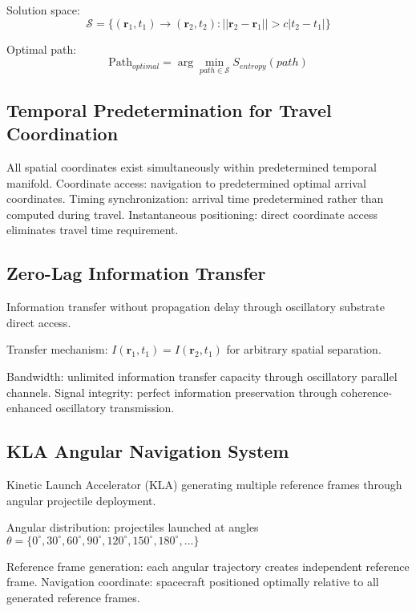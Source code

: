 \documentclass[12pt,a4paper]{article}
\begin{document}
Solution space:
\begin{equation}
\mathcal{S} = \{(\mathbf{r}_1, t_1) \to (\mathbf{r}_2, t_2) : ||\mathbf{r}_2 - \mathbf{r}_1|| > c|t_2 - t_1|\}
\end{equation}

Optimal path:
\begin{equation}
\text{Path}_{optimal} = \arg \min_{path \in \mathcal{S}} S_{entropy}(path)
\end{equation}

\subsection{Temporal Predetermination for Travel Coordination}

All spatial coordinates exist simultaneously within predetermined temporal manifold. Coordinate access: navigation to predetermined optimal arrival coordinates. Timing synchronization: arrival time predetermined rather than computed during travel. Instantaneous positioning: direct coordinate access eliminates travel time requirement.

\subsection{Zero-Lag Information Transfer}

Information transfer without propagation delay through oscillatory substrate direct access.

Transfer mechanism: $I(\mathbf{r}_1, t_1) = I(\mathbf{r}_2, t_1)$ for arbitrary spatial separation.

Bandwidth: unlimited information transfer capacity through oscillatory parallel channels. Signal integrity: perfect information preservation through coherence-enhanced oscillatory transmission.

\subsection{KLA Angular Navigation System}

Kinetic Launch Accelerator (KLA) generating multiple reference frames through angular projectile deployment.

Angular distribution: projectiles launched at angles $\theta = \{0^\circ, 30^\circ, 60^\circ, 90^\circ, 120^\circ, 150^\circ, 180^\circ, \ldots\}$

Reference frame generation: each angular trajectory creates independent reference frame. Navigation coordinate: spacecraft positioned optimally relative to all generated reference frames.
\end{document}
